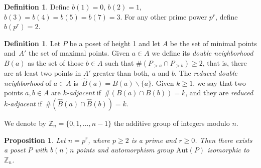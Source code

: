 \documentclass[10pt,a4paper]{amsart}
\newcommand{\Z}{\mathbb{Z}}
\newcommand{\aut}{\textrm{Aut}}
\theoremstyle{plain}
\newtheorem{prop}[cdrthm]{Proposition}
\theoremstyle{definition}
\newtheorem{defi}[cdrthm]{Definition}
\theoremstyle{remark}
\begin{document}
\begin{defi}
Define $b(1)=0$, $b(2)=1$, $b(3)=b(4)=b(5)=b(7)=3$. For any other prime power $p^r$, define $b(p^r)=2$. 
\end{defi}

\begin{defi}
Let $P$ be a poset of height 1 and let $A$ be the set of minimal points and~$A'$ the set of maximal points. Given $a\in A$ we define its \emph{double neighborhood} $B(a)$ as the set of those $b \in A$ such that $\# (P_{> a}\cap P_{> b}) \ge 2$, that is, there are at least two points in $A'$ greater than both, $a$ and $b$. The \emph{reduced double neighborhood} of $a\in A$ is~$\hat{B}(a)=B(a)\smallsetminus \{a\}$. Given $k\ge 1$, we say that two points $a,b\in A$ are \emph{$k$-adjacent} if~$\#(B(a)\cap B(b))=k$, and they are \emph{reduced $k$-adjacent} if~$\#(\hat{B}(a)\cap \hat{B}(b))=k$.
\end{defi}

We denote by $\Z_n=\{0,1,\ldots, n-1\}$ the additive group of integers modulo $n$.

\begin{prop} \label{ejemplos}
Let $n=p^r$, where $p\ge 2$ is a prime and $r\ge 0$. Then there exists a poset $P$ with $b(n)n$ points and automorphism group $\aut(P)$ isomorphic to $\Z_{n}$.  
\end{prop}
\end{document}
